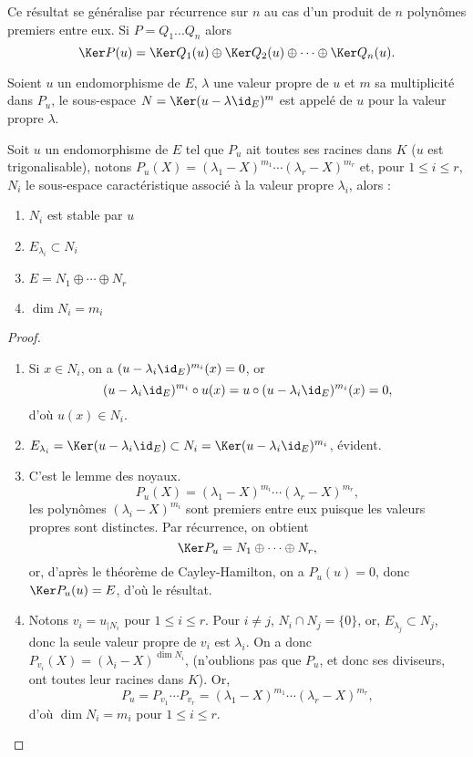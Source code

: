 \documentclass[class=report,crop=false]{standalone}
\begin{document}
Ce résultat se généralise par récurrence sur $n$ au cas d'un produit de $n$ polynômes premiers entre eux. Si $P=Q_1...Q_n$ alors
$$\Ker P(u)=\Ker Q_1(u)\oplus\Ker Q_2(u)\oplus\cdots\oplus\Ker Q_n(u).$$ 

\begin{definition}
Soient $u$ un endomorphisme de $E$, $\lambda$ une valeur propre de $u$ et $m$ sa multiplicité
dans $P_u$, le sous-espace $N=\Ker(u-\lambda\id_E)^m$ est appelé  de $u$ pour la 
valeur propre $\lambda$.
\end{definition} 


\begin{proposition}
Soit $u$ un endomorphisme de $E$ tel que $P_u$ ait toutes ses racines dans $K$ ($u$ est trigonalisable),
 notons $P_u(X)=(\lambda_1-X)^{m{_1}}\cdots(\lambda_r-X)^{m{_r}}$ et, pour $1\leq i\leq r$, $N_i$ le sous-espace caractéristique associé à la
valeur propre $\lambda_i$, alors :

\begin{enumerate}
  \item $N_i$ est stable par $u$
  \item $E_{\lambda_i}\subset N_i$
  \item $E=N_1\oplus\cdots\oplus N_r$
  \item $\dim N_i=m_i$ 
\end{enumerate}
\end{proposition} 


\begin{proof}
\begin{enumerate}
  \item Si $x\in N_i$, on a $(u-\lambda_i\id_E)^{m_i}(x)=0$, or 
$$(u-\lambda_i\id_E)^{m_i}\circ u(x)=u\circ(u-\lambda_i\id_E)^{m_i}(x)=0,$$
d'où $u(x)\in N_i$.
  
  \item $E_{\lambda_i}=\Ker(u-\lambda_i\id_E)\subset N_i=\Ker(u-\lambda_i\id_E)^{m_i}$, évident.

  \item C'est le lemme des noyaux.
$$P_u(X)=(\lambda_1-X)^{m_i}\cdots(\lambda_r-X)^{m_r},$$
les polynômes $(\lambda_i-X)^{m_i}$ sont premiers entre eux puisque les valeurs propres sont distinctes. Par récurrence, on obtient
$$\Ker P_u=N_1\oplus\cdots\oplus N_r,$$
or, d'après le théorème de Cayley-Hamilton, on a $P_u(u)=0$, donc $\Ker P_u(u)=E$, d'où le résultat.
 
  \item Notons $v_i=u_{|N_i}$ pour $1\leq i\leq r$. Pour $i\neq j$, $N_i\cap N_j=\{0\}$, or, $E_{\lambda_j}\subset N_j$, donc la seule valeur propre de $v_i$ est $\lambda_i$. On a donc $P_{v_i}(X)=(\lambda_i-X)^{\dim N_i}$, (n'oublions pas que $P_u$, et donc ses diviseurs, ont toutes leur racines dans $K$). Or,
$$P_u=P_{v_1}\cdots P_{v_r}=(\lambda_1-X)^{m_1}\cdots(\lambda_r-X)^{m_r},$$
d'où $\dim N_i=m_i$ pour $1\leq i\leq r$.
\end{enumerate}
\end{proof}
\end{document}
